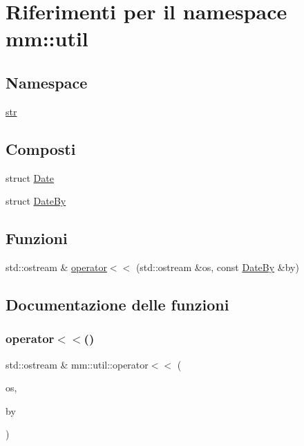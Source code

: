 \hypertarget{namespacemm_1_1util}{}\section{Riferimenti per il namespace mm\+:\+:util}
\label{namespacemm_1_1util}
\subsection*{Namespace}
\begin{DoxyCompactItemize}
\item 
 \mbox{\hyperlink{namespacemm_1_1util_1_1str}{str}}
\end{DoxyCompactItemize}
\subsection*{Composti}
\begin{DoxyCompactItemize}
\item 
struct \mbox{\hyperlink{structmm_1_1util_1_1_date}{Date}}
\item 
struct \mbox{\hyperlink{structmm_1_1util_1_1_date_by}{Date\+By}}
\end{DoxyCompactItemize}
\subsection*{Funzioni}
\begin{DoxyCompactItemize}
\item 
std\+::ostream \& \mbox{\hyperlink{namespacemm_1_1util_a86bb3df244e56f6252ddc9d9be2c1b8a}{operator$<$$<$}} (std\+::ostream \&os, const \mbox{\hyperlink{structmm_1_1util_1_1_date_by}{Date\+By}} \&by)
\end{DoxyCompactItemize}


\subsection{Documentazione delle funzioni}
\mbox{\label{namespacemm_1_1util_a86bb3df244e56f6252ddc9d9be2c1b8a}} 
\subsubsection{\texorpdfstring{operator$<$$<$()}{operator<<()}}
{\footnotesize\ttfamily std\+::ostream \& mm\+::util\+::operator$<$$<$ (\begin{DoxyParamCaption}\item[{std\+::ostream \&}]{os,  }\item[{const \mbox{\hyperlink{structmm_1_1util_1_1_date_by}{Date\+By}} \&}]{by }\end{DoxyParamCaption})}


